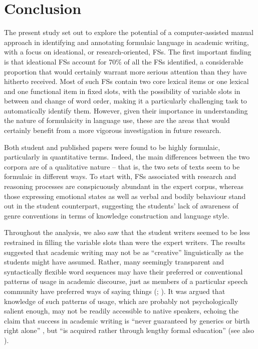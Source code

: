 \documentclass[output=paper]{langscibook}
\begin{document}
\section{Conclusion}

The present study set out to explore the potential of a computer-assisted manual approach in identifying and annotating formulaic language in academic writing, with a focus on ideational, or research-oriented, FSs. The first important finding is that ideational FSs account for 70\% of all the FSs identified, a considerable proportion that would certainly warrant more serious attention than they have hitherto received. Most of such FSs contain two core lexical items or one lexical and one functional item in fixed slots, with the possibility of variable slots in between and change of word order, making it a particularly challenging task to automatically identify them. However, given their importance in understanding the nature of formulaicity in language use, these are the areas that would certainly benefit from a more vigorous investigation in future research.

Both student and published papers were found to be highly formulaic, particularly in quantitative terms. Indeed, the main differences between the two corpora are of a qualitative nature – that is, the two sets of texts seem to be formulaic in different ways. To start with, FSs associated with research and reasoning processes are conspicuously abundant in the expert corpus, whereas those expressing emotional states as well as verbal and bodily behaviour stand out in the student counterpart, suggesting the students’ lack of awareness of genre conventions in terms of knowledge construction and language style.

Throughout the analysis, we also saw that the student writers seemed to be less restrained in filling the variable slots than were the expert writers. The results suggested that academic writing may not be as ``creative'' linguistically as the students might have assumed. Rather, many seemingly transparent and syntactically flexible word sequences may have their preferred or conventional patterns of usage in academic discourse, just as members of a particular speech community have preferred ways of saying things (\citealt{Wray2002}; \citealt{Kecskes2016}). It was argued that knowledge of such patterns of usage, which are probably not psychologically salient enough, may not be readily accessible to native speakers, echoing the claim that success in academic writing is “never guaranteed by generics or birth right alone” \citep[116]{Rajagopalan2004}, but “is acquired rather through lengthy formal education” \citep[42]{FergusonEtAl2011} (see also \citealt{Hyland2016}). 
\end{document}
